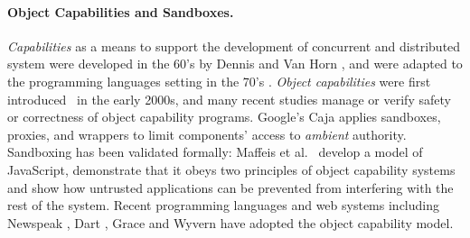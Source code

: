 


\paragraph{Object Capabilities and Sandboxes.}
{{\em Capabilities} as a means to support the development of concurrent and distributed system  were developed in the 60's
by Dennis and Van Horn \cite{Dennis66}, and were adapted to the
programming languages setting in the 70's \cite{JamesMorris}. 
{\em Object capabilities} were first introduced~\cite{MillerPhD} in the early 2000s},
 and many recent %
studies manage
or verify  safety or correctness of object capability programs.
Google's Caja \cite{Caja} applies   sandboxes, proxies, and wrappers
 to limit components'
access to \textit{ambient} authority.
Sandboxing has been validated
formally: Maffeis et al.\ \cite{mmt-oakland10} develop a model of
JavaScript, demonstrate that it obeys two principles of
object capability systems
and show  how untrusted applications can be prevented from interfering with
the rest of the system. 
Recent programming languages and web systems
\cite{CapJavaHayesAPLAS17,CapNetSocc17Eide,DOCaT14} including Newspeak
\cite{newspeak17}, Dart \cite{dart15}, Grace \cite{grace,graceClasses}
and Wyvern \cite{wyverncapabilities} have adopted the object
capability model.


